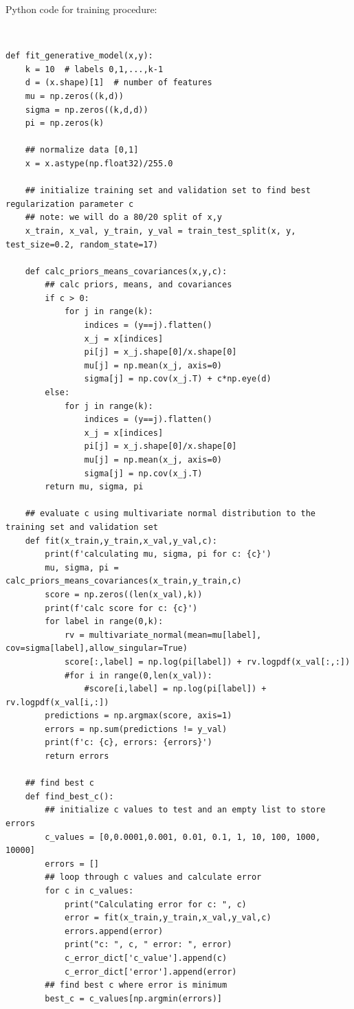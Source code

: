 \documentclass{article}
\begin{document}
\parbox{\textwidth}{Python code for training procedure:}\\
\begin{lstlisting}[style=pythonstyle]
def fit_generative_model(x,y):
    k = 10  # labels 0,1,...,k-1
    d = (x.shape)[1]  # number of features
    mu = np.zeros((k,d))
    sigma = np.zeros((k,d,d))
    pi = np.zeros(k)

    ## normalize data [0,1]
    x = x.astype(np.float32)/255.0

    ## initialize training set and validation set to find best regularization parameter c
    ## note: we will do a 80/20 split of x,y
    x_train, x_val, y_train, y_val = train_test_split(x, y, test_size=0.2, random_state=17)

    def calc_priors_means_covariances(x,y,c):
        ## calc priors, means, and covariances
        if c > 0:
            for j in range(k):
                indices = (y==j).flatten()
                x_j = x[indices]
                pi[j] = x_j.shape[0]/x.shape[0]
                mu[j] = np.mean(x_j, axis=0)
                sigma[j] = np.cov(x_j.T) + c*np.eye(d)
        else:
            for j in range(k):
                indices = (y==j).flatten()
                x_j = x[indices]
                pi[j] = x_j.shape[0]/x.shape[0]
                mu[j] = np.mean(x_j, axis=0)
                sigma[j] = np.cov(x_j.T) 
        return mu, sigma, pi

    ## evaluate c using multivariate normal distribution to the training set and validation set
    def fit(x_train,y_train,x_val,y_val,c):
        print(f'calculating mu, sigma, pi for c: {c}')
        mu, sigma, pi = calc_priors_means_covariances(x_train,y_train,c)
        score = np.zeros((len(x_val),k))
        print(f'calc score for c: {c}')
        for label in range(0,k):
            rv = multivariate_normal(mean=mu[label], cov=sigma[label],allow_singular=True)
            score[:,label] = np.log(pi[label]) + rv.logpdf(x_val[:,:])
            #for i in range(0,len(x_val)):
                #score[i,label] = np.log(pi[label]) + rv.logpdf(x_val[i,:])
        predictions = np.argmax(score, axis=1)
        errors = np.sum(predictions != y_val)
        print(f'c: {c}, errors: {errors}')
        return errors

    ## find best c
    def find_best_c():
        ## initialize c values to test and an empty list to store errors
        c_values = [0,0.0001,0.001, 0.01, 0.1, 1, 10, 100, 1000, 10000]
        errors = []
        ## loop through c values and calculate error
        for c in c_values:
            print("Calculating error for c: ", c)
            error = fit(x_train,y_train,x_val,y_val,c)
            errors.append(error)
            print("c: ", c, " error: ", error)
            c_error_dict['c_value'].append(c)
            c_error_dict['error'].append(error)
        ## find best c where error is minimum
        best_c = c_values[np.argmin(errors)]


\end{lstlisting}
\end{document}
